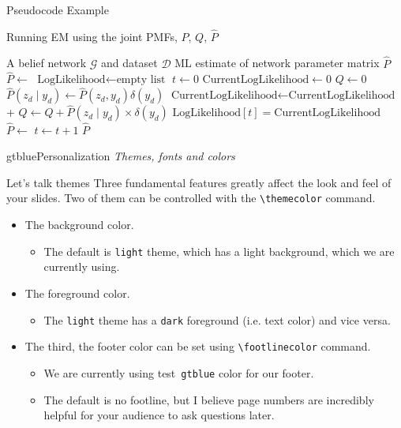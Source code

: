\documentclass{beamer}
\newcommand{\testcolor}[1]{\colorbox{#1}{\textcolor{#1}{test}}~\texttt{#1}}
\begin{document}
\begin{frame}[fragile]{Pseudocode Example}
\begin{algorithm}[H]
\fontsize{8}{1}\selectfont
\caption{Running EM using the joint PMFs, $P$, $Q$, $\hat P$}
\begin{algorithmic}
\REQUIRE A belief network $\mathcal{G}$ and dataset $ \mathcal{D}$
\ENSURE ML estimate of network parameter matrix $\hat P$
\STATE $\hat P \gets$ 
\STATE $\text{LogLikelihood} \gets \text{empty list}$
\STATE $t \gets 0$
\REPEAT
    \STATE $\text{CurrentLogLikelihood} \gets 0$
    \STATE $Q \gets 0$
        \STATE $\hat P(z_d \mid y_d) \gets \hat P(z_d, y_d) \delta(y_d)$
        \STATE $\text{CurrentLogLikelihood} \gets \text{CurrentLogLikelihood}$ + 
        \STATE $Q \gets Q + \hat P(z_d \mid y_d) \times \delta(y_d)$ 
    \ENDFOR
    \STATE $\text{LogLikelihood}[t] = \text{CurrentLogLikelihood}$
    \STATE $\hat P \gets$  
    \STATE $t \gets t + 1$
\RETURN $\hat P$
\end{algorithmic}
\end{algorithm}
\end{frame}



\begin{chapter}{gtblue}{Personalization}
\textit{Themes, fonts and colors}
\end{chapter}


\begin{frame}[fragile]{Let's talk themes}
Three fundamental features greatly affect the look and feel of your slides. Two of them can be controlled with the \verb|\themecolor| command.
\begin{itemize}
\item The background color.
\begin{itemize}
    \item The default is \verb|light| theme, which has a light background, which we are currently using.
\end{itemize}
\item The foreground color.
\begin{itemize}
    \item The \verb|light| theme has a \verb|dark| foreground (i.e. text color) and vice versa.
\end{itemize}
\item The third, the footer color can be set using \verb|\footlinecolor| command.
\begin{itemize}
    \item We are currently using \testcolor{gtblue} color for our footer.
    \item The default is no footline, but I believe page numbers are incredibly helpful for your audience to ask questions later.
\end{itemize}
\end{itemize}
\end{frame}
\end{document}
